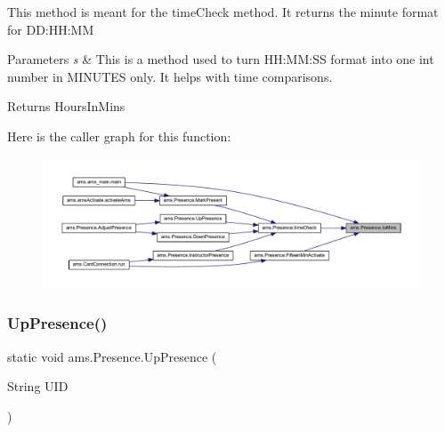 This method is meant for the time\+Check method. It returns the minute format for D\+D\+:\+HH\+:MM


\begin{DoxyParams}{Parameters}
{\em s} & This is a method used to turn H\+H\+:\+MM\+:SS format into one int number in M\+I\+N\+U\+T\+ES only. It helps with time comparisons. \\
\hline
\end{DoxyParams}
\begin{DoxyReturn}{Returns}
Hours\+In\+Mins 
\end{DoxyReturn}
Here is the caller graph for this function\+:\nopagebreak
\begin{figure}[H]
\begin{center}
\leavevmode
\includegraphics[width=350pt]{classams_1_1_presence_ac7407509b71e22e2ca2fde9d52681b73_icgraph}
\end{center}
\end{figure}
\mbox{\label{classams_1_1_presence_af23602b98a9a3003ff240fd5cd133378}} 
\subsubsection{\texorpdfstring{UpPresence()}{UpPresence()}}
{\footnotesize\ttfamily static void ams.\+Presence.\+Up\+Presence (\begin{DoxyParamCaption}\item[{String}]{U\+ID }\end{DoxyParamCaption})\hspace{0.3cm}{\ttfamily [static]}}

